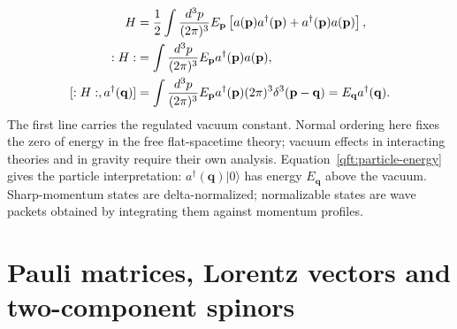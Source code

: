 \begin{align}
 H&=\frac12\int\frac{d^3p}{(2\pi)^3}E_{\mathbf p}
 \left[a(\mathbf p)a^\dagger(\mathbf p)
       +a^\dagger(\mathbf p)a(\mathbf p)\right],\notag\\
 :H:&=\int\frac{d^3p}{(2\pi)^3}E_{\mathbf p}
 a^\dagger(\mathbf p)a(\mathbf p),\notag\\
 [:H:,a^\dagger(\mathbf q)]
 &=\int\frac{d^3p}{(2\pi)^3}E_{\mathbf p}
 a^\dagger(\mathbf p)(2\pi)^3\delta^3(\mathbf p-\mathbf q)
 =E_{\mathbf q}a^\dagger(\mathbf q).
 \label{qft:particle-energy}
\end{align}
The first line carries the regulated vacuum constant. Normal ordering
here fixes the zero of energy in the free flat-spacetime theory; vacuum
effects in interacting theories and in gravity require their own analysis.
Equation~\eqref{qft:particle-energy} gives the particle interpretation:
$a^\dagger(\mathbf q)|0\rangle$ has energy $E_{\mathbf q}$ above the vacuum.
Sharp-momentum states are delta-normalized; normalizable states are wave
packets obtained by integrating them against momentum profiles.

\section{Pauli matrices, Lorentz vectors and two-component spinors}
\label{qft:sec:spinors}

